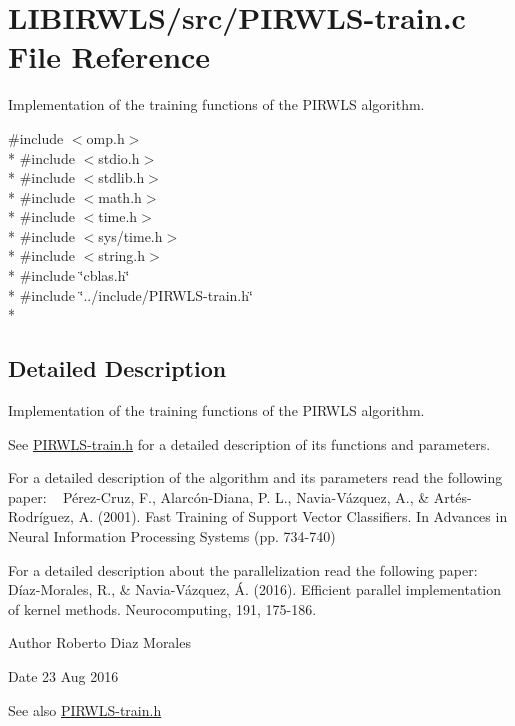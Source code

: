 \hypertarget{PIRWLS-train_8c}{}\section{L\+I\+B\+I\+R\+W\+L\+S/src/\+P\+I\+R\+W\+L\+S-\/train.c File Reference}
\label{PIRWLS-train_8c}


Implementation of the training functions of the P\+I\+R\+W\+LS algorithm.  


{\ttfamily \#include $<$omp.\+h$>$}\\*
{\ttfamily \#include $<$stdio.\+h$>$}\\*
{\ttfamily \#include $<$stdlib.\+h$>$}\\*
{\ttfamily \#include $<$math.\+h$>$}\\*
{\ttfamily \#include $<$time.\+h$>$}\\*
{\ttfamily \#include $<$sys/time.\+h$>$}\\*
{\ttfamily \#include $<$string.\+h$>$}\\*
{\ttfamily \#include \char`\"{}cblas.\+h\char`\"{}}\\*
{\ttfamily \#include \char`\"{}../include/\+P\+I\+R\+W\+L\+S-\/train.\+h\char`\"{}}\\*


\subsection{Detailed Description}
Implementation of the training functions of the P\+I\+R\+W\+LS algorithm. 

See \hyperlink{PIRWLS-train_8h}{P\+I\+R\+W\+L\+S-\/train.\+h} for a detailed description of its functions and parameters.

For a detailed description of the algorithm and its parameters read the following paper\+: ~\newline
 Pérez-\/\+Cruz, F., Alarcón-\/\+Diana, P. L., Navia-\/\+Vázquez, A., \& Artés-\/\+Rodríguez, A. (2001). Fast Training of Support Vector Classifiers. In Advances in Neural Information Processing Systems (pp. 734-\/740)

For a detailed description about the parallelization read the following paper\+: ~\newline
Díaz-\/\+Morales, R., \& Navia-\/\+Vázquez, Á. (2016). Efficient parallel implementation of kernel methods. Neurocomputing, 191, 175-\/186.

\begin{DoxyAuthor}{Author}
Roberto Diaz Morales 
\end{DoxyAuthor}
\begin{DoxyDate}{Date}
23 Aug 2016 
\end{DoxyDate}
\begin{DoxySeeAlso}{See also}
\hyperlink{PIRWLS-train_8h}{P\+I\+R\+W\+L\+S-\/train.\+h} 
\end{DoxySeeAlso}
